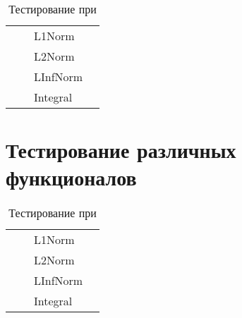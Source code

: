 \begin{table}
	\caption{Тестирование при }
	\centering
	\small
	\begin{tabularx}{1.0\textwidth}{| >{\raggedright\arraybackslash}X | >{\raggedright\arraybackslash}X | >{\raggedright\arraybackslash}X | >{\raggedright\arraybackslash}X |}
		\hline
		\centering{Входные точки}  & \centering{Функция} & \centering{Функционал} & \centering{Результат} \tabularnewline \hline    
		
		\multirow{4}{*}{\centering{(0.5; 0.5; 0.5)}} & \multirow{4}{*}{\centering{FFFFF}} & L1Norm & \centering{0.00000000E+000; 0.00000000E+000; 0.00000000E+000} \tabularnewline \cline{3-4}
		& & L2Norm & \centering{0.00000000E+000; 0.00000000E+000; 0.00000000E+000} \tabularnewline \cline{3-4}
		& & LInfNorm & \centering{0.00000000E+000; 0.00000000E+000; 0.00000000E+000} \tabularnewline \cline{3-4}
		& & Integral & \centering{0.00000000E+000; 0.00000000E+000; 0.00000000E+000} \tabularnewline \hline
	\end{tabularx}
	\label{tab:test10}
\end{table}

\section{Тестирование различных функционалов}

\begin{table}
	\caption{Тестирование при }
	\centering
	\small
	\begin{tabularx}{1.0\textwidth}{| >{\raggedright\arraybackslash}X | >{\raggedright\arraybackslash}X | >{\raggedright\arraybackslash}X | >{\raggedright\arraybackslash}X |}
		\hline
		\centering{Входные точки}  & \centering{Функция} & \centering{Функционал} & \centering{Результат} \tabularnewline \hline    
		
		\multirow{4}{*}{\centering{(0.5; 0.5; 0.5)}} & \multirow{4}{*}{\centering{FFFFF}} & L1Norm & \centering{0.00000000E+000; 0.00000000E+000; 0.00000000E+000} \tabularnewline \cline{3-4}
		& & L2Norm & \centering{0.00000000E+000; 0.00000000E+000; 0.00000000E+000} \tabularnewline \cline{3-4}
		& & LInfNorm & \centering{0.00000000E+000; 0.00000000E+000; 0.00000000E+000} \tabularnewline \cline{3-4}
		& & Integral & \centering{0.00000000E+000; 0.00000000E+000; 0.00000000E+000} \tabularnewline \hline
	\end{tabularx}
	\label{tab:test1}
\end{table}

